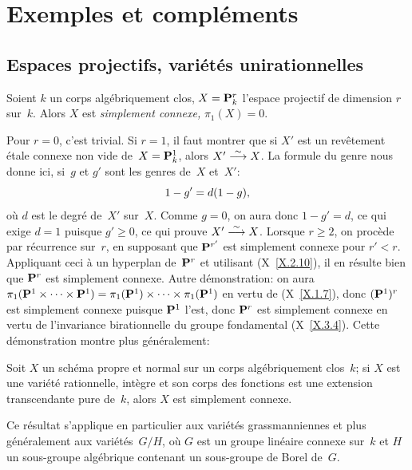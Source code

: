 \chapter{Exemples et compl\'ements}
\label{XI}

\section{Espaces projectifs, vari\'et\'es unirationnelles}
\label{XI.1}

\begin{proposition}
\label{XI.1.1}
Soient $k$ un corps alg\'ebriquement clos, $X=\mathbf{P}_k^r$ l'espace
projectif de dimension $r$ sur~$k$. Alors $X$ est \emph{simplement
connexe,} \ie $\pi_1(X)=0$.
\end{proposition}

Pour $r=0$, c'est trivial. Si $r=1$, il faut montrer que si $X'$ est
un rev\^etement \'etale connexe non vide de~$X=\mathbf{P}_k^1$, alors
$X'\overset{\sim}{\longrightarrow} X$. La formule du genre nous donne ici, si~$g$ et $g'$ sont
les genres de~$X$ et~$X'$:
$$
1-g' = d(1-g),
$$
o\`u $d$ est le degr\'e de~$X'$ sur~$X$. Comme $g=0$, on aura donc
$1-g'=d$, ce qui exige $d=1$ puisque $g'\ge 0$, ce qui prouve
$X'\overset{\sim}{\longrightarrow} X$. Lorsque $r\ge 2$, on proc\`ede par r\'ecurrence
sur~$r$, en supposant que $\mathbf{P}^{r'}$ est simplement connexe pour
$r'<r$. Appliquant ceci \`a un hyperplan de~$\mathbf{P}^r$ et utilisant
(X~\ref{X.2.10}), il en r\'esulte bien que $\mathbf{P}^r$ est simplement
connexe. Autre d\'emonstration: on aura
$\pi_1(\mathbf{P}^1\times\cdots\times \mathbf{P}^1) = \pi_1(\mathbf{P}^1)\times\cdots
\times \pi_1(\mathbf{P}^1)$ en vertu de (X~\ref{X.1.7}), donc $(\mathbf{P}^1)^r$
est simplement connexe puisque $\mathbf{P}^1$ l'est, donc $\mathbf{P}^r$ est
simplement connexe en vertu de l'invariance birationnelle du groupe
fondamental (X~\ref{X.3.4}). Cette d\'emonstration montre plus
g\'en\'eralement:

\begin{corollaire}
\label{XI.1.2}
Soit $X$ un sch\'ema propre et normal sur un corps
alg\'ebriquement clos~$k$; si $X$ est une vari\'et\'e
rationnelle, \ie int\`egre et son corps des fonctions est une
extension transcendante pure de~$k$, alors $X$ est simplement connexe.
\end{corollaire}

Ce r\'esultat s'applique en particulier aux vari\'et\'es
grassmanniennes et plus
g\'en\'e\-ra\-le\-ment aux vari\'et\'es~$G/H$, o\`u $G$ est un
groupe lin\'eaire connexe sur~$k$ et $H$ un sous-groupe
alg\'ebrique contenant un sous-groupe de Borel
de~$G$.

